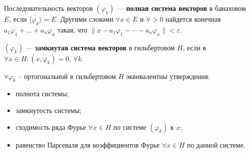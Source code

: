 \begin{to_def}
	Последовательность векторов $(\varphi_k)$ --- \textbf{полная система векторов}  в банаховом $E$, если $\overline{\langle \varphi_k\rangle} = E$. Другими словами $\forall x \in E$ и $\forall >0$ найдется конечная $a_1 \varphi_1 + \ldots + a_n \varphi_n$ такая, что $\|x - a_1 \varphi_1 - \cdots - a_n \varphi_n\|<\varepsilon$.
\end{to_def}

\begin{to_def}
	$(\varphi_k)$ --- \textbf{замкнутая система векторов} в гильбертовом $H$, если в $\forall x \in H \colon (x, \varphi_k) = 0, \, \forall k$.
\end{to_def}

\begin{to_thr}
	$\forall \varphi_k$ -- ортогональной в гильбертовом $H$ эквивалентны утверждения:
	\begin{itemize}
		\item полнота системы;
		\item замкнутость системы;
		\item сходимость ряда Фурье $\forall x \in H$ по системе $(\varphi_k)$ к $x$;
		\item равенство Парсеваля для коэффициентов Фурье $\forall x \in H$ по данной системе.
	\end{itemize}
\end{to_thr}


